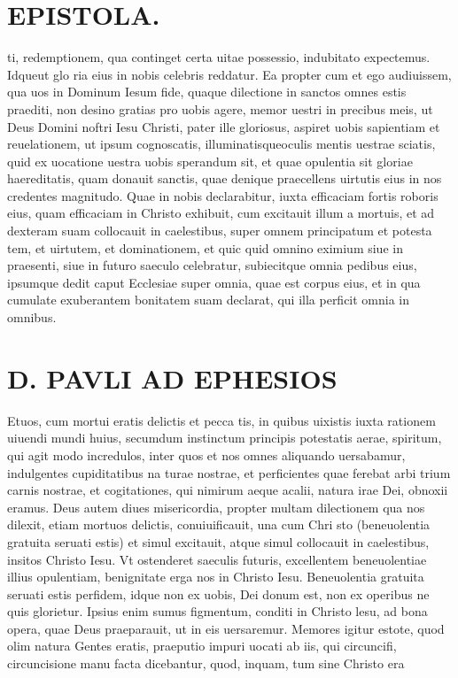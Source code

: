 \documentclass{article}
\begin{document}
\begin{pages}
\section*{EPISTOLA. }
\marginpar{[ p.90 ]}
\marginpar{[ p.91 ]}
\marginpar{[ p.92 ]}\pstart ti, redemptionem, qua continget certa uitae possessio, indubitato expectemus. Idqueut glo ria eius in nobis celebris reddatur.  \pend\pstart Ea propter cum et ego audiuissem, qua uos in Dominum Iesum fide, quaque dilectione in sanctos omnes estis praediti, non desino gratias pro uobis agere, memor uestri in precibus meis, ut Deus Domini noftri Iesu Christi, pater ille gloriosus, aspiret uobis sapientiam et reuelationem, ut ipsum cognoscatis, illuminatisqueoculis mentis uestrae sciatis, quid ex uocatione uestra uobis sperandum sit, et quae opulentia sit gloriae haereditatis, quam donauit sanctis, quae denique praecellens uirtutis eius in nos credentes magnitudo.  \pend\pstart Quae in nobis declarabitur, iuxta efficaciam fortis roboris eius, quam efficaciam in Christo exhibuit, cum excitauit illum a mortuis, et ad dexteram suam collocauit in caelestibus, super omnem principatum et potesta tem, et uirtutem, et dominationem, et quic quid omnino eximium siue in praesenti, siue in futuro saeculo celebratur, subiecitque omnia pedibus eius, ipsumque dedit caput Ecclesiae super omnia, quae est corpus eius, et in qua cumulate exuberantem bonitatem suam declarat, qui illa perficit omnia in omnibus.  \pend
\section*{D. PAVLI AD EPHESIOS }
\marginpar{[ p.1. ]}
\marginpar{[ p.2. ]}
\marginpar{[ p.3. ]}
\marginpar{[ p.4. ]}\pstart Etuos, cum mortui eratis delictis et pecca tis, in quibus uixistis iuxta rationem uiuendi mundi huius, secumdum instinctum principis potestatis aerae, spiritum, qui agit modo incredulos, inter quos et nos omnes aliquando uersabamur, indulgentes cupiditatibus na turae nostrae, et perficientes quae ferebat arbi trium carnis nostrae, et cogitationes, qui nimirum aeque acalii, natura irae Dei, obnoxii eramus.  \pend\pstart Deus autem diues misericordia, propter multam dilectionem qua nos dilexit, etiam mortuos delictis, conuiuificauit, una cum Chri sto (beneuolentia gratuita seruati estis) et simul excitauit, atque simul collocauit in caelestibus, insitos Christo Iesu. Vt ostenderet saeculis futuris, excellentem beneuolentiae illius opulentiam, benignitate erga nos in Christo Iesu.  \pend\pstart Beneuolentia gratuita seruati estis perfidem, idque non ex uobis, Dei donum est, non ex operibus ne quis glorietur. Ipsius enim sumus figmentum, conditi in Christo lesu, ad bona opera, quae Deus praeparauit, ut in eis uersaremur.  \pend\pstart Memores igitur estote, quod olim natura Gentes eratis, praeputio impuri uocati ab iis, qui circuncifi, circuncisione manu facta dicebantur, quod, inquam, tum sine Christo era\pend
\end{pages}
\end{document}
